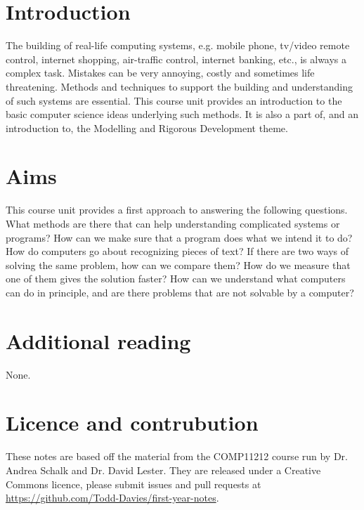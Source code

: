 \section*{Introduction}

The building of real-life computing systems, e.g. mobile phone, tv/video remote
control, internet shopping, air-traffic control, internet banking, etc., is
always a complex task. Mistakes can be very annoying, costly and sometimes life
threatening. Methods and techniques to support the building and understanding of
such systems are essential. This course unit provides an introduction to the
basic computer science ideas underlying such methods. It is also a part of, and
an introduction to, the Modelling and Rigorous Development theme.

\section*{Aims}

This course unit provides a first approach to answering the following questions.
What methods are there that can help understanding complicated systems or
programs? How can we make sure that a program does what we intend it to do? How
do computers go about recognizing pieces of text? If there are two ways of
solving the same problem, how can we compare them? How do we measure that one of
them gives the solution faster? How can we understand what computers can do in
principle, and are there problems that are not solvable by a computer?

\section*{Additional reading}

None.

\section*{Licence and contrubution}

These notes are based off the material from the COMP11212 course run by 
Dr. Andrea Schalk and Dr. David Lester. They are released
under a Creative Commons licence, please submit issues and pull requests at
\url{https://github.com/Todd-Davies/first-year-notes}.